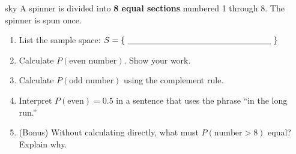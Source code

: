\documentclass[10pt]{article}
\begin{document}
\namedateperiod

\vspace{0.14in}

\begin{scenariobox}[Context]{sky}
\small
A spinner is divided into \textbf{8 equal sections} numbered 1 through 8. The spinner
is spun once.
\end{scenariobox}

\vspace{0.1in}

\begin{practicebox}
\small
\begin{enumerate}[leftmargin=1.5em, itemsep=10pt]
  \item List the sample space: $S = \{\ \blank{6cm}\ \}$

  \item Calculate $P(\text{even number})$. Show your work.
        \vspace{18pt}

  \item Calculate $P(\text{odd number})$ using the complement rule.
        \vspace{18pt}

  \item Interpret $P(\text{even}) = 0.5$ in a sentence that uses the phrase
        ``in the long run.''\\
        \writeline\writeline

  \item (Bonus) Without calculating directly, what must $P(\text{number} > 8)$ equal?
        Explain why. \blank{6cm}
\end{enumerate}
\end{practicebox}
\end{document}
